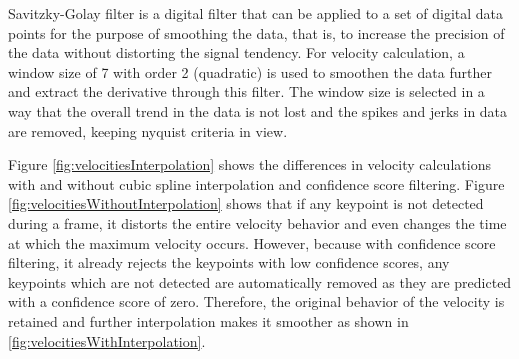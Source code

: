 Savitzky-Golay filter is a digital filter that can be applied to a set of digital data points for the purpose of smoothing the data, that is, to increase the precision of the data without distorting the signal tendency. For velocity calculation, a window size of 7 with order 2 (quadratic) is used to smoothen the data further and extract the derivative through this filter. The window size is selected in a way that the overall trend in the data is not lost and the spikes and jerks in data are removed, keeping nyquist criteria in view. 

Figure \ref{fig:velocitiesInterpolation} shows the differences in velocity calculations with and without cubic spline interpolation and confidence score filtering. Figure \ref{fig:velocitiesWithoutInterpolation} shows that if any keypoint is not detected during a frame, it distorts the entire velocity behavior and even changes the time at which the maximum velocity occurs. However, because with confidence score filtering, it already rejects the keypoints with low confidence scores, any keypoints which are not detected are automatically removed as they are predicted with a confidence score of zero. Therefore, the original behavior of the velocity is retained and further interpolation makes it smoother as shown in \ref{fig:velocitiesWithInterpolation}.

